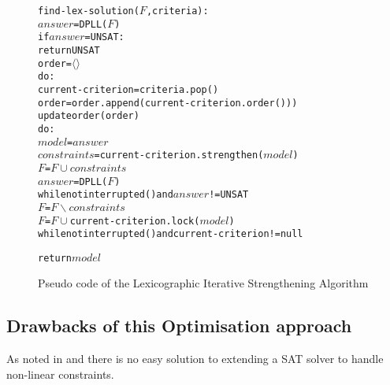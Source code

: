 \begin{figure}[htp]
\begin{center}
\begin{alltt}
find-lex-solution(\(F\),criteria):
    \(answer\) = DPLL(\(F\))
    if \(answer\) = UNSAT:
        return UNSAT
    order = \(\langle \rangle\)
    do:
        current-criterion = criteria.pop()
        order = order.append(current-criterion.order()))
        updateorder(order)
        do:
            \(model\) = \(answer\)
            \(constraints\) = current-criterion.strengthen(\(model\))
            \(F\) = \(F \cup constraints\)
            \(answer\) = DPLL(\(F\))
        while not interrupted() and \(answer\) != UNSAT
        \(F\) = \(F \backslash constraints\)
        \(F\) = \(F \cup \) current-criterion.lock(\(model\))
    while not interrupted() and current-criterion != null
        
    return \(model\) 
\end{alltt}
  \caption{Pseudo code of the Lexicographic Iterative Strengthening Algorithm}
  \label{impl.strength}
\end{center}
\end{figure}

\subsection{Drawbacks of this Optimisation approach}

As noted in \cite{le_berre_dependency_2009} and \cite{leBerre2010} there is no easy solution to extending a SAT solver to handle non-linear constraints.






